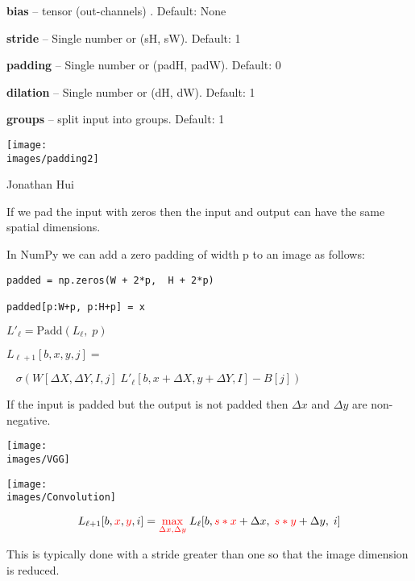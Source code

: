 {\medskip
{\bf bias} – tensor (out-channels) . Default: None

\medskip
{\bf stride} – Single number or (sH, sW). Default: 1

\medskip
{\bf padding} – Single number or (padH, padW). Default: 0

\medskip
{\bf dilation} – Single number or (dH, dW). Default: 1

\medskip
{\bf groups} – split input into groups. Default: 1


\centerline{\texttt{[image: \\images/padding2]}}
\centerline{\large Jonathan Hui}

\vfill
If we pad the input with zeros then the input and output can have the same spatial dimensions.


In NumPy we can add a zero padding of width p to an image as follows:

\vfill
\begin{verbatim}
padded = np.zeros(W + 2*p,  H + 2*p)

padded[p:W+p, p:H+p] = x
\end{verbatim}


$L'_{{\ell}} = \mathrm{Padd}(L_{{\ell}},\;p)$

\vfill
$L_{{\ell+1}}[b,x,y,j] =$

\vfill
$\;\;\;\sigma\left(W[\Delta X, \Delta Y, I,j]\;L'_{{\ell}}[b,x + \Delta X, y + \Delta Y, I] - B[j] \right)$

\vfill
If the input is padded but the output is not padded then $\Delta x$ and $\Delta y$ are non-negative.


\centerline{\texttt{[image: \\images/VGG]}}



\centerline{\texttt{[image: \\images/Convolution]}}

\vfill
$$L_{{\ell+1}}[b,{\color{red}x},{\color{red}y},i] = {\color{red} \max_{\Delta x, \Delta y}}\; L_{{\ell}}[b,{\color{red} s*x} + \Delta x,\; {\color{red} s*y} + \Delta y,\; i]$$

\vfill
This is typically done with a stride greater than one so that the image dimension is reduced.


}

